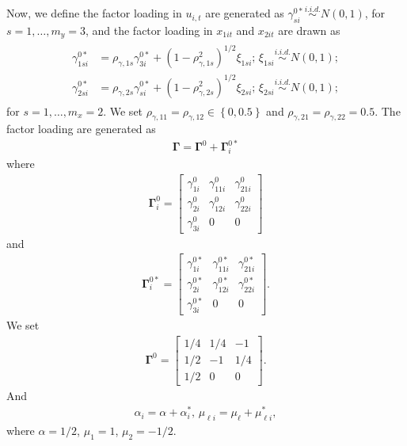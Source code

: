 \documentclass[12pt,a4paper,hyperref]{article}
\begin{document}
Now, we define the factor loading in $u_{i,t}$ are generated as $\gamma^{0\ast}_{si}\overset{i.i.d.}{\sim}N\left(0, 1 \right)$, for $s=1,\ldots, m_{y}=3$, and the factor loading in $x_{1it}$ and $x_{2it}$ are drawn as
\begin{align}
\begin{split}
\gamma^{0\ast}_{1si}&=\rho_{\gamma,1s} \gamma^{0\ast}_{3i}+\left(1-\rho^{2}_{\gamma,1s}  \right)^{1/2}\xi_{1si};\,\xi_{1si}\overset{i.i.d.}{\sim}N\left(0, 1 \right); \\
\gamma^{0\ast}_{2si}&=\rho_{\gamma,2s} \gamma^{0\ast}_{si}+\left(1-\rho^{2}_{\gamma,2s}  \right)^{1/2}\xi_{2si};\,\xi_{2si}\overset{i.i.d.}{\sim}N\left(0, 1 \right);
\end{split}
\end{align}
for $s=1,\ldots, m_{x}=2$. We set $\rho_{\gamma, 11}=\rho_{\gamma, 12} \in \left\{0, 0.5 \right\}$ and $\rho_{\gamma, 21}=\rho_{\gamma, 22}=0.5.$
The factor loading are generated as
\begin{align}
\boldsymbol{\Gamma}=\boldsymbol{\Gamma}^{0}+\boldsymbol{\Gamma}^{0\ast}_{i}
\end{align}
where
\begin{align}
\boldsymbol{\Gamma}^{0}_{i}=
\begin{bmatrix}
\gamma^{0}_{1i} & \gamma^{0}_{11i} & \gamma^{0}_{21i} \\
\gamma^{0}_{2i} & \gamma^{0}_{12i} & \gamma^{0}_{22i} \\
\gamma^{0}_{3i} &  0               &     0
\end{bmatrix}
\end{align}
and 
\begin{align}
\boldsymbol{\Gamma}^{0\ast}_{i}=
\begin{bmatrix}
\gamma^{0\ast}_{1i} & \gamma^{0\ast}_{11i} & \gamma^{0\ast}_{21i} \\
\gamma^{0\ast}_{2i} & \gamma^{0\ast}_{12i} & \gamma^{0\ast}_{22i} \\
\gamma^{0\ast}_{3i} &  0               &     0
\end{bmatrix}.
\end{align}
We set 
\begin{align}
\boldsymbol{\Gamma}^{0}=
\begin{bmatrix}
1/4 & 1/4 & -1 \\
1/2 & -1  & 1/4 \\
1/2 & 0   & 0
\end{bmatrix} .
\end{align}
And 
\begin{align}
\alpha_{i}=\alpha+ \alpha^{\ast}_{i}, \, \mu_{\ell i}= \mu_{\ell}+\mu^{\ast}_{\ell i},
\end{align}
where $\alpha=1/2$, $\mu_{1}=1$, $\mu_{2}=-1/2$.
\end{document}
